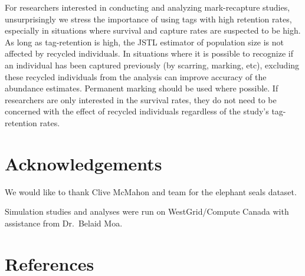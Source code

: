 \documentclass[]{article}
\begin{document}
For researchers interested in conducting and analyzing mark-recapture
studies, unsurprisingly we stress the importance of using tags with high retention
rates, especially in situations where survival and capture rates are
suspected to be high. As long as tag-retention is high, the JSTL
estimator of population size is not affected by recycled individuals. In
situations where it is possible to recognize if an individual has been
captured previously (by scarring, marking, etc), excluding these
recycled individuals from the analysis can improve accuracy of the
abundance estimates. Permanent marking should be used where possible. If
researchers are only interested in the survival rates, they do not need
to be concerned with the effect of recycled individuals regardless of
the study's tag-retention rates.

\section{Acknowledgements}\label{acknowledgements}

We would like to thank Clive McMahon and team for the elephant seals
dataset.

Simulation studies and analyses were run on WestGrid/Compute Canada with
assistance from Dr.~Belaid Moa.

\section{References}\label{references}




\bigskip




\end{document}
